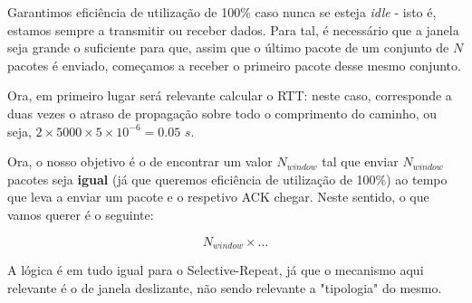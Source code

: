 
Garantimos eficiência de utilização de 100\% caso nunca se esteja \textit{idle} - isto é,
estamos sempre a transmitir ou receber dados. Para tal, é necessário que a janela seja
grande o suficiente para que, assim que o último pacote de um conjunto de $N$ pacotes
é enviado, começamos a receber o primeiro pacote desse mesmo conjunto.

Ora, em primeiro lugar será relevante calcular o RTT: neste caso, corresponde a
duas vezes o atraso de propagação sobre todo o comprimento do caminho, ou seja,
$2 \times 5000 \times 5 \times 10^{-6} = 0.05$ $s$.

Ora, o nosso objetivo é o de encontrar um valor $N_{window}$ tal que enviar $N_{window}$
pacotes seja \textbf{igual} (já que queremos eficiência de utilização de 100\%) ao tempo
que leva a enviar um pacote e o respetivo ACK chegar. Neste sentido, o que vamos querer
é o seguinte:

$$
  N_{window} \times \dots
$$

A lógica é em tudo igual para o Selective-Repeat, já que o mecanismo aqui relevante
é o de janela deslizante, não sendo relevante a "tipologia" do mesmo.
